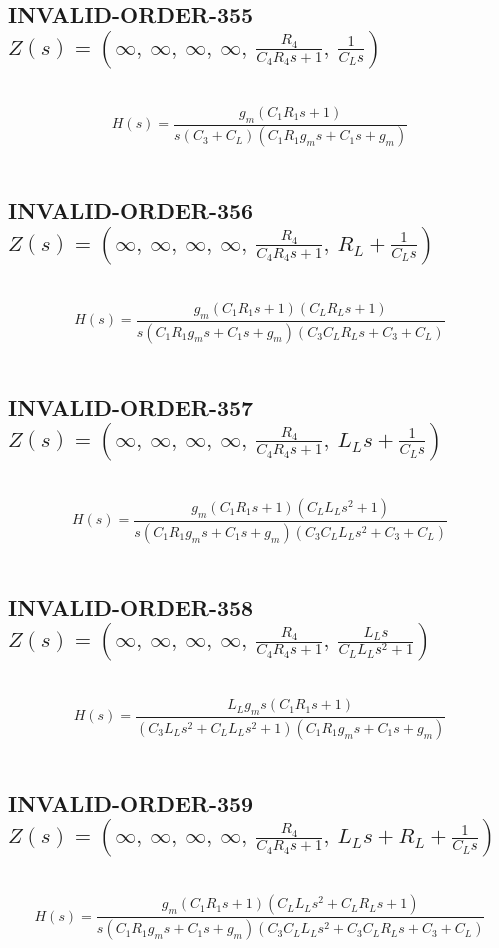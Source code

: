 \documentclass{article}
\begin{document}
\subsection{INVALID-ORDER-355 $Z(s) = \left( \infty, \  \infty, \  \infty, \  \infty, \  \frac{R_{4}}{C_{4} R_{4} s + 1}, \  \frac{1}{C_{L} s}\right)$ } \ 
\textbf{\[H(s) = \frac{g_{m} \left(C_{1} R_{1} s + 1\right)}{s \left(C_{3} + C_{L}\right) \left(C_{1} R_{1} g_{m} s + C_{1} s + g_{m}\right)}\] } \ 
\subsection{INVALID-ORDER-356 $Z(s) = \left( \infty, \  \infty, \  \infty, \  \infty, \  \frac{R_{4}}{C_{4} R_{4} s + 1}, \  R_{L} + \frac{1}{C_{L} s}\right)$ } \ 
\textbf{\[H(s) = \frac{g_{m} \left(C_{1} R_{1} s + 1\right) \left(C_{L} R_{L} s + 1\right)}{s \left(C_{1} R_{1} g_{m} s + C_{1} s + g_{m}\right) \left(C_{3} C_{L} R_{L} s + C_{3} + C_{L}\right)}\] } \ 
\subsection{INVALID-ORDER-357 $Z(s) = \left( \infty, \  \infty, \  \infty, \  \infty, \  \frac{R_{4}}{C_{4} R_{4} s + 1}, \  L_{L} s + \frac{1}{C_{L} s}\right)$ } \ 
\textbf{\[H(s) = \frac{g_{m} \left(C_{1} R_{1} s + 1\right) \left(C_{L} L_{L} s^{2} + 1\right)}{s \left(C_{1} R_{1} g_{m} s + C_{1} s + g_{m}\right) \left(C_{3} C_{L} L_{L} s^{2} + C_{3} + C_{L}\right)}\] } \ 
\subsection{INVALID-ORDER-358 $Z(s) = \left( \infty, \  \infty, \  \infty, \  \infty, \  \frac{R_{4}}{C_{4} R_{4} s + 1}, \  \frac{L_{L} s}{C_{L} L_{L} s^{2} + 1}\right)$ } \ 
\textbf{\[H(s) = \frac{L_{L} g_{m} s \left(C_{1} R_{1} s + 1\right)}{\left(C_{3} L_{L} s^{2} + C_{L} L_{L} s^{2} + 1\right) \left(C_{1} R_{1} g_{m} s + C_{1} s + g_{m}\right)}\] } \ 
\subsection{INVALID-ORDER-359 $Z(s) = \left( \infty, \  \infty, \  \infty, \  \infty, \  \frac{R_{4}}{C_{4} R_{4} s + 1}, \  L_{L} s + R_{L} + \frac{1}{C_{L} s}\right)$ } \ 
\textbf{\[H(s) = \frac{g_{m} \left(C_{1} R_{1} s + 1\right) \left(C_{L} L_{L} s^{2} + C_{L} R_{L} s + 1\right)}{s \left(C_{1} R_{1} g_{m} s + C_{1} s + g_{m}\right) \left(C_{3} C_{L} L_{L} s^{2} + C_{3} C_{L} R_{L} s + C_{3} + C_{L}\right)}\] } \ 
\end{document}
